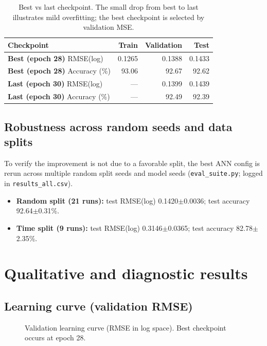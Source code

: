 \documentclass[11pt]{article}
\newcommand{\AnnEpochs}{30}
\newcommand{\AnnBestEpoch}{28}
\newcommand{\AnnBestTrainRmse}{0.1265}
\newcommand{\AnnBestValRmse}{0.1388}
\newcommand{\AnnBestTestRmse}{0.1433}
\newcommand{\AnnBestTrainAcc}{93.06}
\newcommand{\AnnBestValAcc}{92.67}
\newcommand{\AnnBestTestAcc}{92.62}
\newcommand{\AnnLastValRmse}{0.1399}
\newcommand{\AnnLastTestRmse}{0.1439}
\newcommand{\AnnLastValAcc}{92.49}
\newcommand{\AnnLastTestAcc}{92.39}
\newcommand{\AnnRandRmseMean}{0.1420}
\newcommand{\AnnRandRmseStd}{0.0036}
\newcommand{\AnnRandAccMean}{92.64}
\newcommand{\AnnRandAccStd}{0.31}
\newcommand{\AnnTimeRmseMean}{0.3146}
\newcommand{\AnnTimeRmseStd}{0.0365}
\newcommand{\AnnTimeAccMean}{82.78}
\newcommand{\AnnTimeAccStd}{2.35}
\begin{document}
\begin{table}[h]
\centering
\small
\begin{tabular}{@{}lrrr@{}}
\toprule
Checkpoint & Train & Validation & Test \\
\midrule
\textbf{Best (epoch \AnnBestEpoch)} RMSE(log) & \AnnBestTrainRmse & \AnnBestValRmse & \AnnBestTestRmse \\
\textbf{Best (epoch \AnnBestEpoch)} Accuracy (\%) & \AnnBestTrainAcc & \AnnBestValAcc & \AnnBestTestAcc \\
\addlinespace
\textbf{Last (epoch \AnnEpochs)} RMSE(log) & --- & \AnnLastValRmse & \AnnLastTestRmse \\
\textbf{Last (epoch \AnnEpochs)} Accuracy (\%) & --- & \AnnLastValAcc & \AnnLastTestAcc \\
\bottomrule
\end{tabular}
\caption{Best vs last checkpoint. The small drop from best to last illustrates mild overfitting; the best checkpoint is selected by validation MSE.}
\label{tab:ann-best-vs-last}
\end{table}

\subsection{Robustness across random seeds and data splits}
To verify the improvement is not due to a favorable split, the best ANN config is rerun across multiple random split seeds and model seeds (\texttt{eval\_suite.py}; logged in \texttt{results\_all.csv}).
\begin{itemize}[leftmargin=*]
  \item \textbf{Random split (21 runs):} test RMSE(log) \AnnRandRmseMean\(\pm\)\AnnRandRmseStd; test accuracy \AnnRandAccMean\(\pm\)\AnnRandAccStd\%.
  \item \textbf{Time split (9 runs):} test RMSE(log) \AnnTimeRmseMean\(\pm\)\AnnTimeRmseStd; test accuracy \AnnTimeAccMean\(\pm\)\AnnTimeAccStd\%.
\end{itemize}

\section{Qualitative and diagnostic results}
\subsection{Learning curve (validation RMSE)}
\begin{figure}[h]
\centering
{}
\caption{Validation learning curve (RMSE in log space). Best checkpoint occurs at epoch \AnnBestEpoch.}
\label{fig:ann-val-curve}
\end{figure}
\end{document}
